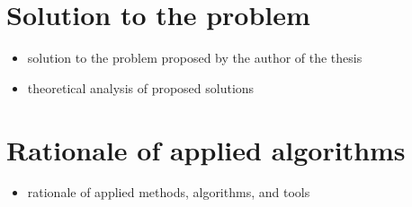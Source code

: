 \section{Solution to the problem}


\begin{itemize}
    \item solution to the problem proposed by the author of the thesis
    \item theoretical analysis of proposed solutions
\end{itemize}
    

\section{Rationale of applied algorithms}


\begin{itemize}
    \item rationale of applied methods, algorithms, and tools
\end{itemize}
